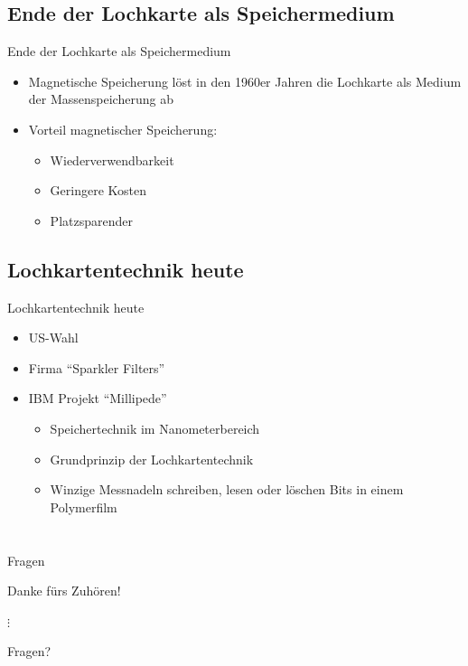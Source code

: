 \documentclass[EU2]{beamer}
\begin{document}
\subsection{Ende der Lochkarte als Speichermedium}
\begin{frame}{Ende der Lochkarte als Speichermedium}
  \begin{itemize}
    \item Magnetische Speicherung löst in den 1960er Jahren die Lochkarte als Medium der Massenspeicherung ab
    \item Vorteil magnetischer Speicherung:
        \begin{itemize}
          \item Wiederverwendbarkeit
          \item Geringere Kosten
	  \item Platzsparender
       \end{itemize}
 \end{itemize}
\end{frame}

\subsection{Lochkartentechnik heute}
\begin{frame}{Lochkartentechnik heute}
  \begin{itemize}
    \item US-Wahl
    \item Firma \enquote{Sparkler Filters}
    \item IBM Projekt \enquote{Millipede}
        \begin{itemize}
          \item Speichertechnik im Nanometerbereich
          \item Grundprinzip der Lochkartentechnik
	  \item Winzige Messnadeln schreiben, lesen oder löschen Bits in einem Polymerfilm
       \end{itemize}
  \end{itemize}
\end{frame}

\section*{}

\begin{frame}{Fragen}
  \begin{center}
    \Large{Danke fürs Zuhören!}
  \end{center}
  \begin{center}
    $\vdots$
  \end{center}
  \begin{center}
    \Large{Fragen?}
  \end{center}
\end{frame}
\end{document}
